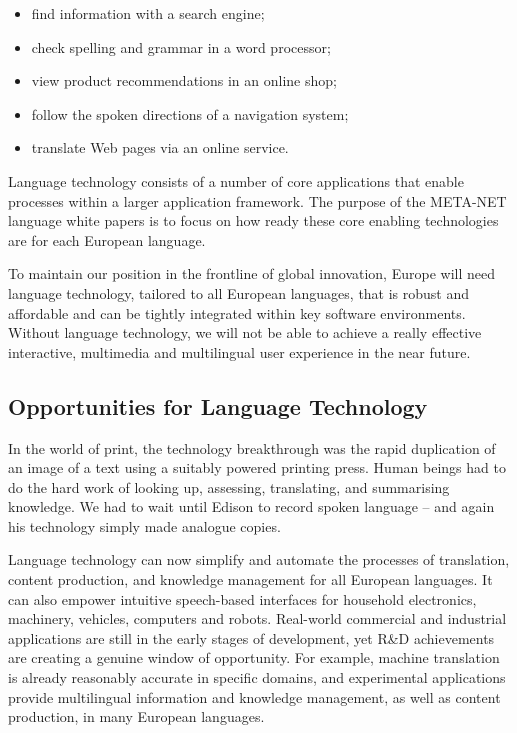 \begin{multicols}{2}
\begin{itemize}
\item find information with a search engine;
\item check spelling and grammar in a word processor;
\item view product recommendations in an online shop;
\item follow the spoken directions of a navigation system;
\item translate Web pages via an online service.
\end{itemize}

Language technology consists of a number of core applications that enable processes within a larger application framework. The purpose of the META-NET language white papers is to focus on how ready these core enabling technologies are for each European language. 


To maintain our position in the frontline of global innovation, Europe will need language technology, tailored to all European languages, that is robust and affordable and can be tightly integrated within key software environments. Without language technology, we will not be able to achieve a really effective interactive, multimedia and multilingual user experience in the near future.

\subsection{Opportunities for Language Technology}

In the world of print, the technology breakthrough was the rapid duplication of an image of a text using a suitably powered printing press. Human beings had to do the hard work of looking up, assessing, translating, and summarising knowledge. We had to wait until Edison to record spoken language -- and again his technology simply made analogue copies.

Language technology can now simplify and automate the processes of translation, content production, and knowledge management for all European languages. It can also empower intuitive speech-based interfaces for household electronics, machinery, vehicles, computers and robots. Real-world commercial and industrial applications are still in the early stages of development, yet R\&D achievements are creating a genuine window of opportunity. For example, machine translation is already reasonably accurate in specific domains, and experimental applications provide multilingual information and knowledge management, as well as content production, in many European languages. 


\end{multicols}
